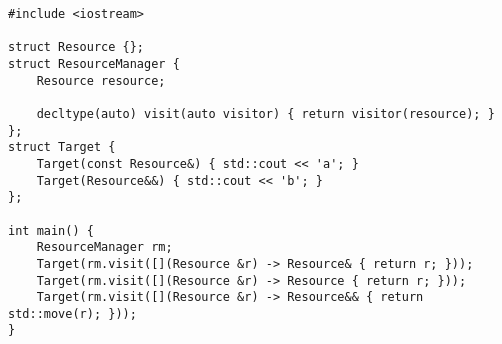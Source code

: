 \begin{lstlisting}[title=\href{https://godbolt.org/z/5-QMbZ}{\texttt{godbolt.org/z/5-QMbZ}}]
#include <iostream>

struct Resource {};
struct ResourceManager {
    Resource resource;

    decltype(auto) visit(auto visitor) { return visitor(resource); }
};
struct Target {
    Target(const Resource&) { std::cout << 'a'; }
    Target(Resource&&) { std::cout << 'b'; }
};

int main() {
    ResourceManager rm;
    Target(rm.visit([](Resource &r) -> Resource& { return r; }));
    Target(rm.visit([](Resource &r) -> Resource { return r; }));
    Target(rm.visit([](Resource &r) -> Resource&& { return std::move(r); }));
}
\end{lstlisting}
